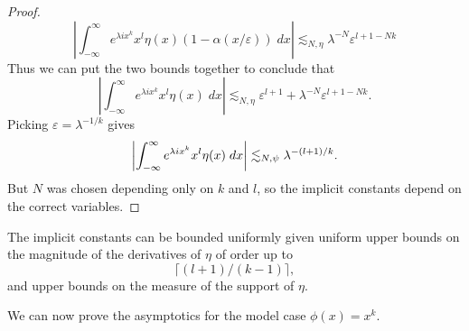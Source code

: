 \begin{proof}
  \[ \left| \int_{-\infty}^\infty e^{\lambda i x^k} x^l \eta(x) (1 - \alpha(x/\varepsilon))\; dx \right| \lesssim_{N,\eta} \lambda^{-N} \varepsilon^{l + 1 - Nk} \]
  Thus we can put the two bounds together to conclude that
  \[ \left| \int_{-\infty}^\infty e^{\lambda i x^k} x^l \eta(x)\; dx \right| \lesssim_{N,\eta} \varepsilon^{l+1} + \lambda^{-N} \varepsilon^{l+1-Nk}. \]
  Picking $\varepsilon = \lambda^{-1/k}$ gives
  \[ \left| \int_{-\infty}^\infty e^{\lambda i x^k} x^l \eta(x)\; dx \right| \lesssim_{N,\psi} \lambda^{-(l+1)/k}. \qedhere \]
  But $N$ was chosen depending only on $k$ and $l$, so the implicit constants depend on the correct variables.
\end{proof}

\begin{remark}
  The implicit constants can be bounded uniformly given uniform upper bounds on the magnitude of the derivatives of $\eta$ of order up to
  \[ \lceil (l+1)/(k-1) \rceil, \]
  and upper bounds on the measure of the support of $\eta$.
\end{remark}

We can now prove the asymptotics for the model case $\phi(x) = x^k$.


